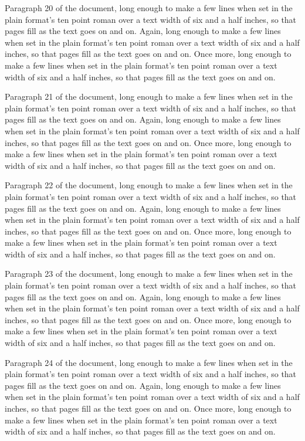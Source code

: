 Paragraph 20 of the document, long enough to make a few lines when set in the plain format's ten point roman over a text width of six and a half inches, so that pages fill as the text goes on and on. Again, long enough to make a few lines when set in the plain format's ten point roman over a text width of six and a half inches, so that pages fill as the text goes on and on. Once more, long enough to make a few lines when set in the plain format's ten point roman over a text width of six and a half inches, so that pages fill as the text goes on and on.

Paragraph 21 of the document, long enough to make a few lines when set in the plain format's ten point roman over a text width of six and a half inches, so that pages fill as the text goes on and on. Again, long enough to make a few lines when set in the plain format's ten point roman over a text width of six and a half inches, so that pages fill as the text goes on and on. Once more, long enough to make a few lines when set in the plain format's ten point roman over a text width of six and a half inches, so that pages fill as the text goes on and on.

Paragraph 22 of the document, long enough to make a few lines when set in the plain format's ten point roman over a text width of six and a half inches, so that pages fill as the text goes on and on. Again, long enough to make a few lines when set in the plain format's ten point roman over a text width of six and a half inches, so that pages fill as the text goes on and on. Once more, long enough to make a few lines when set in the plain format's ten point roman over a text width of six and a half inches, so that pages fill as the text goes on and on.

Paragraph 23 of the document, long enough to make a few lines when set in the plain format's ten point roman over a text width of six and a half inches, so that pages fill as the text goes on and on. Again, long enough to make a few lines when set in the plain format's ten point roman over a text width of six and a half inches, so that pages fill as the text goes on and on. Once more, long enough to make a few lines when set in the plain format's ten point roman over a text width of six and a half inches, so that pages fill as the text goes on and on.

Paragraph 24 of the document, long enough to make a few lines when set in the plain format's ten point roman over a text width of six and a half inches, so that pages fill as the text goes on and on. Again, long enough to make a few lines when set in the plain format's ten point roman over a text width of six and a half inches, so that pages fill as the text goes on and on. Once more, long enough to make a few lines when set in the plain format's ten point roman over a text width of six and a half inches, so that pages fill as the text goes on and on.

